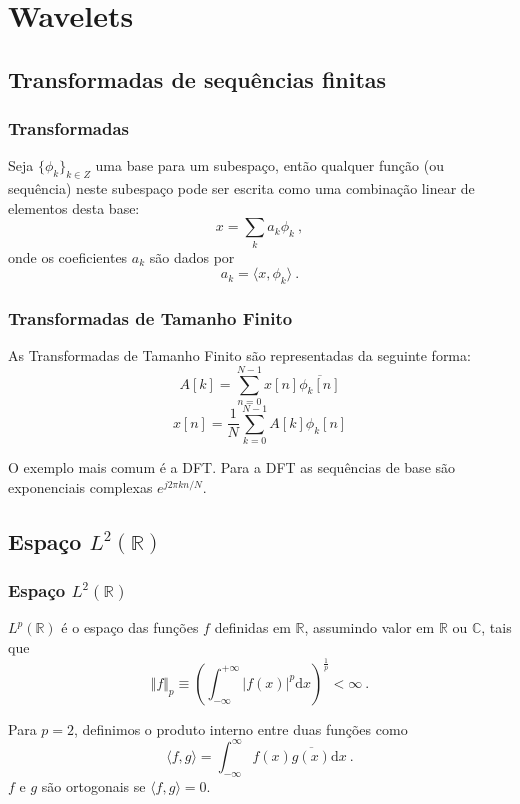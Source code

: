 \section{Wavelets}

\subsection{Transformadas de sequências finitas}
\begin{frame}%
  \frametitle{Transformadas}
  Seja $\{\phi_k\}_{k \in Z}$ uma base para um subespaço, então qualquer
  função (ou sequência) neste subespaço pode ser escrita como uma combinação
  linear de elementos desta base:
  \begin{equation}
        x = \sum_k a_k \phi_k \ ,
  \end{equation}  
  onde os coeficientes $a_k$ são dados por
  \begin{equation}
        a_k = \langle x , \phi_k \rangle \ .
  \end{equation}
\end{frame}

\begin{frame}%
  \frametitle{Transformadas de Tamanho Finito}
  As Transformadas de Tamanho Finito são representadas da seguinte forma:
  \begin{equation}
  A[k] = \sum_{n=0}^{N-1} x[n] \overline{\phi_k[n]}
  \label{eq:fltransform}
  \end{equation}
  \begin{equation}
        x[n] = \frac{1}{N} \sum_{k=0}^{N-1} A[k] \phi_k [n]
  \label{eq:ifltransform}
  \end{equation}
  
   O exemplo mais comum é a DFT.
   Para a DFT as sequências de base são exponenciais complexas $e^{j2\pi kn/N}$.
\end{frame}

\subsection{Espaço $L^2(\mathbb{R})$}
\begin{frame}%
  \frametitle{Espaço $L^2(\mathbb{R})$}
  $L^p(\mathbb{R})$ é o espaço das funções $f$ definidas em $\mathbb{R}$, assumindo
  valor em $\mathbb{R}$ ou $\mathbb{C}$, tais que
  \begin{equation}
        \Vert f \Vert_p \equiv \left( \int_{-\infty}^{+\infty} \vert f(x) \vert^p \mathrm{d}x \right)^{\frac{1}{p}} < \infty \ .
  \end{equation}
  
  Para $p=2$, definimos o produto interno entre duas funções como
  \begin{equation}
        \langle f,g \rangle = \int_{-\infty}^{\infty} f(x) \overline{g(x)} \mathrm{d}x \ .
  \end{equation}
  $f$ e $g$ são ortogonais se $\langle f,g \rangle = 0$.
\end{frame}

